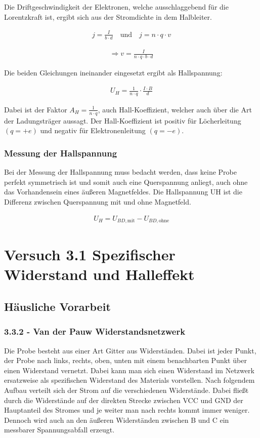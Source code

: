 \documentclass[a4paper]{scrartcl}
\numberwithin{equation}{subsection}
\begin{document}
Die Driftgeschwindigkeit der Elektronen, welche ausschlaggebend für die Lorentzkraft ist, ergibt sich aus der Stromdichte in dem Halbleiter. \cite{anl}

\begin{align}
j = \frac{I}{b \cdot d} \quad \text{und} \quad j = n \cdot q \cdot v
\end{align}

\begin{align}
\Rightarrow v = \frac{I}{n \cdot q \cdot b \cdot d}
\end{align}

Die beiden Gleichungen ineinander eingesetzt ergibt als Hallspannung:

\begin{align}
U_H = \frac{1}{n \cdot q} \cdot \frac{I \cdot B}{d}
\end{align}

Dabei ist der Faktor $A_H = \frac{1}{n \cdot q}$, auch Hall-Koeffizient, welcher auch über die Art der Ladungsträger aussagt. Der Hall-Koeffizient ist positiv für Löcherleitung $(q = +e)$ und negativ für Elektronenleitung $(q = -e)$. \cite{anl}

\subsubsection{Messung der Hallspannung}

Bei der Messung der Hallspannung muss bedacht werden, dass keine Probe perfekt symmetrisch ist und somit auch eine Querspannung anliegt, auch ohne das Vorhandensein eines äußeren Magnetfeldes. Die Hallspannung UH ist die Differenz zwischen Querspannung mit und ohne Magnetfeld. \cite{anl}

\begin{align}
U_H = U_{BD,\text{mit}} - U_{BD,\text{ohne}}
\end{align}


\newpage

\section{Versuch 3.1 Spezifischer Widerstand und Halleffekt}
\subsection{Häusliche Vorarbeit}
\subsubsection{3.3.2 - Van der Pauw Widerstandsnetzwerk}
Die Probe besteht aus einer Art Gitter aus Widerständen. Dabei ist jeder Punkt, der Probe nach links, rechts, oben, unten mit einem benachbarten Punkt über einen Widerstand vernetzt. Dabei kann man sich einen Widerstand im Netzwerk ersatzweise als spezifischen Widerstand des Materials vorstellen. Nach folgendem Aufbau verteilt sich der Strom auf die verschiedenen Widerstände. Dabei fließt durch die Widerstände auf der direkten Strecke zwischen VCC und GND der Hauptanteil des Stromes und je weiter man nach rechts kommt immer weniger. Dennoch wird auch an den äußeren Widerständen zwischen B und C ein messbarer Spannungsabfall erzeugt.
\end{document}
